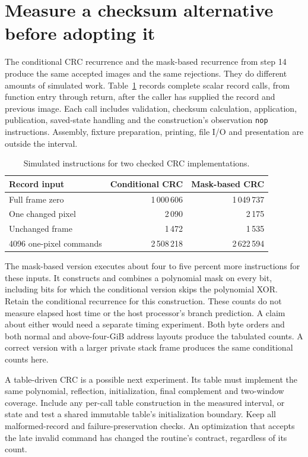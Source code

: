 \section{Measure a checksum alternative before adopting it}
The conditional CRC recurrence and the mask-based recurrence from step 14 produce
the same accepted images and the same rejections. They do different amounts of
simulated work. Table~\ref{tab:video-record-work} records complete scalar record
calls, from function entry through return, after the caller has supplied the
record and previous image. Each call includes validation, checksum calculation,
application, publication, saved-state handling and the construction's observation
\texttt{nop} instructions. Assembly, fixture preparation, printing, file I/O and
presentation are outside the interval.

\begin{table}[htbp]
  \centering
  \caption{Simulated instructions for two checked CRC implementations.}
  \label{tab:video-record-work}
  \begin{tabular}{lrr}
    \toprule
    Record input            & Conditional CRC & Mask-based CRC \\
    \midrule
    Full frame zero         & 1\,000\,606     & 1\,049\,737    \\
    One changed pixel       & 2\,090          & 2\,175         \\
    Unchanged frame         & 1\,472          & 1\,535         \\
    4096 one-pixel commands & 2\,508\,218     & 2\,622\,594    \\
    \bottomrule
  \end{tabular}
\end{table}

The mask-based version executes about four to five percent more instructions for
these inputs. It constructs and combines a polynomial mask on every bit, including
bits for which the conditional version skips the polynomial XOR. Retain the
conditional recurrence for this construction. These counts do not measure elapsed
host time or the host processor's branch prediction. A claim about either would
need a separate timing experiment. Both byte orders and both normal and
above-four-GiB address layouts produce the tabulated counts. A correct version
with a larger private stack frame produces the same conditional counts here.

A table-driven CRC is a possible next experiment. Its table must implement the same
polynomial, reflection, initialization, final complement and two-window coverage.
Include any per-call table construction in the measured interval, or state and
test a shared immutable table's initialization boundary. Keep all malformed-record
and failure-preservation checks. An optimization that accepts the late invalid
command has changed the routine's contract, regardless of its count.
